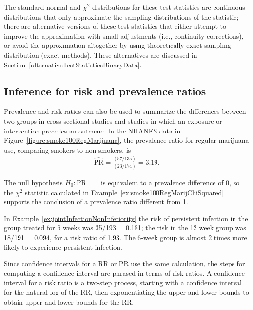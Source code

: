 The standard normal and $\chi^2$  distributions for these test statistics are continuous distributions that only approximate the sampling distributions of the statistic; there are alternative versions of these test statistics that either attempt to improve the approximation with small adjustments (i.e., continuity corrections), or avoid the approximation altogether by using theoretically exact sampling distribution (exact methods).  These alternatives are discussed in Section~\ref{alternativeTestStatisticsBinaryData}.

\subsection{Inference for risk and prevalence ratios}
\label{inferenceRiskRatio}

Prevalence and risk ratios can also be used to summarize the differences between two groups in cross-sectional studies and studies in which an exposure or intervention precedes an outcome.  In the NHANES data in Figure~\ref{figure:smoke100RegMarijuana}, the prevalence ratio for regular marijuana use, comparing smokers to non-smokers, is
\begin{align*}
      \widehat{\text{PR}} = \frac{(57/135)}{(23/174)} = 3.19.
\end{align*}

The null hypothesis $H_0: \text{PR} = 1$ is equivalent to a prevalence difference of 0, so the $\chi^2$ statistic calculated in Example~\ref{ex:smoke100RegMarijChiSquared} supports the conclusion of a prevalence ratio different from 1.

In Example~\ref{ex:jointInfectionNonInferiority} the risk of persistent infection in the group treated for 6 weeks was 35/193 = 0.181; the risk in the 12 week group was 18/191 = 0.094, for a risk ratio of 1.93.  The 6-week group is almost 2 times more likely to experience persistent infection.

Since confidence intervals for a RR or PR use the same calculation, the steps for computing a confidence interval are phrased in terms of risk ratios. A confidence interval for a risk ratio is a two-step process,  starting with a confidence interval for the natural log of the RR, then exponentiating the upper and lower bounds to obtain upper and lower bounds for the RR.



